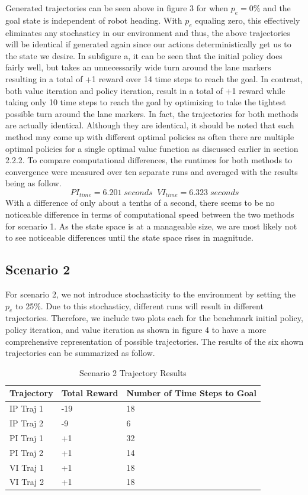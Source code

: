 \documentclass[fullpage]{article}
\begin{document}
Generated trajectories can be seen above in figure 3 for when $p_e = 0\%$ and the goal state is independent of robot heading. With $p_e$ equaling zero, this effectively eliminates any stochasticy in our environment and thus, the above trajectories will be identical if generated again since our actions deterministically get us to the state we desire. In subfigure a, it can be seen that the initial policy does fairly well, but takes an unnecessarily wide turn around the lane markers resulting in a total of +1 reward over 14 time steps to reach the goal. In contrast, both value iteration and policy iteration, result in a total of +1 reward while taking only 10 time steps to reach the goal by optimizing to take the tightest possible turn around the lane markers. In fact, the trajectories for both methods are actually identical. Although they are identical, it should be noted that each method may come up with different optimal policies as often there are multiple optimal policies for a single optimal value function as discussed earlier in section 2.2.2.
To compare computational differences, the runtimes for both methods to convergence were measured over ten separate runs and averaged with the results being as follow.
\[
PI_{time} = 6.201 \; seconds \; \; VI_{time} = 6.323 \; seconds
\]
With a difference of only about a tenths of a second, there seems to be no noticeable difference in terms of computational speed between the two methods for scenario 1. As the state space is at a manageable size, we are most likely not to see noticeable differences until the state space rises in magnitude.

\subsection{Scenario 2}

For scenario 2, we not introduce stochasticity to the environment by setting the $p_e$ to 25\%. Due to this stochasticy, different runs will result in different trajectories. Therefore, we include two plots each for the benchmark initial policy, policy iteration, and value iteration as shown in figure 4 to have a more comprehensive representation of possible trajectories. The results of the six shown trajectories can be summarized as follow.
\begin{table}[H]
\centering
\begin{tabular}{lll}
\hline
Trajectory & Total Reward & Number of Time Steps to Goal \\ \hline
IP Traj 1 & -19          & 18                           \\
IP Traj 2 & -9           & 6                            \\
PI Traj 1 & +1           & 32                           \\
PI Traj 2 & +1           & 14                           \\
VI Traj 1 & +1           & 18                           \\
VI Traj 2 & +1           & 18                          
\end{tabular}
\caption{Scenario 2 Trajectory Results}
\end{table}
\end{document}
